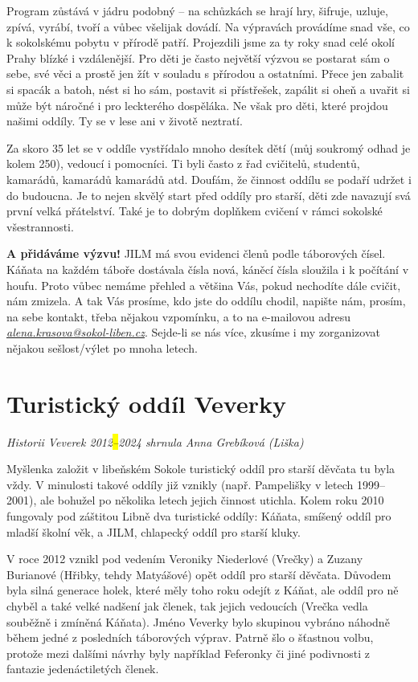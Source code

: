 Program zůstává v jádru podobný -- na schůzkách se hrají hry, šifruje,
uzluje, zpívá, vyrábí, tvoří a vůbec všelijak dovádí. Na výpravách
provádíme snad vše, co k sokolskému pobytu v přírodě patří. Projezdili
jsme za ty roky snad celé okolí Prahy blízké i vzdálenější. Pro děti je
často největší výzvou se postarat sám o sebe, své věci a prostě jen žít
v souladu s přírodou a ostatními. Přece jen zabalit si spacák a batoh,
nést si ho sám, postavit si přístřešek, zapálit si oheň a uvařit si může
být náročné i pro leckterého dospěláka. Ne však pro děti, které projdou
našimi oddíly. Ty se v lese ani v životě neztratí.

Za skoro 35 let se v oddíle vystřídalo mnoho desítek dětí (můj soukromý
odhad je kolem 250), vedoucí i pomocníci. Ti byli často z řad cvičitelů,
studentů, kamarádů, kamarádů kamarádů atd. Doufám, že činnost oddílu se
podaří udržet i do budoucna. Je to nejen skvělý start před oddíly pro
starší, děti zde navazují svá první velká přátelství. Také je to dobrým
doplňkem cvičení v rámci sokolské všestrannosti.

\textbf{A přidáváme výzvu!} JILM má svou evidenci členů podle táborových
čísel. Káňata na každém táboře dostávala čísla nová, káněcí čísla
sloužila i k počítání v houfu. Proto vůbec nemáme přehled a většina Vás,
pokud nechodíte dále cvičit, nám zmizela. A tak Vás prosíme, kdo jste do
oddílu chodil, napište nám, prosím, na sebe kontakt, třeba nějakou
vzpomínku, a to na e-mailovou adresu
\emph{\ul{alena.krasova@sokol-liben.cz}}. Sejde-li se nás více, zkusíme
i my zorganizovat nějakou sešlost/výlet po mnoha letech.

\section{Turistický oddíl Veverky}\label{turistickuxfd-odduxedl-veverky}

\emph{Historii Veverek 2012\hl{--}2024 shrnula Anna Grebíková (Liška)}

Myšlenka založit v libeňském Sokole turistický oddíl pro starší děvčata
tu byla vždy. V minulosti takové oddíly již vznikly (např. Pampelišky v
letech 1999--2001), ale bohužel po několika letech jejich činnost
utichla. Kolem roku 2010 fungovaly pod záštitou Libně dva turistické
oddíly: Káňata, smíšený oddíl pro mladší školní věk, a JILM, chlapecký
oddíl pro starší kluky.

V roce 2012 vznikl pod vedením Veroniky Niederlové (Vrečky) a Zuzany
Burianové (Hřibky, tehdy Matyášové) opět oddíl pro starší děvčata.
Důvodem byla silná generace holek, které měly toho roku odejít z Káňat,
ale oddíl pro ně chyběl a také velké nadšení jak členek, tak jejich
vedoucích (Vrečka vedla souběžně i zmíněná Káňata). Jméno Veverky bylo
skupinou vybráno náhodně během jedné z posledních táborových výprav.
Patrně šlo o šťastnou volbu, protože mezi dalšími návrhy byly například
Feferonky či jiné podivnosti z fantazie jedenáctiletých členek.

